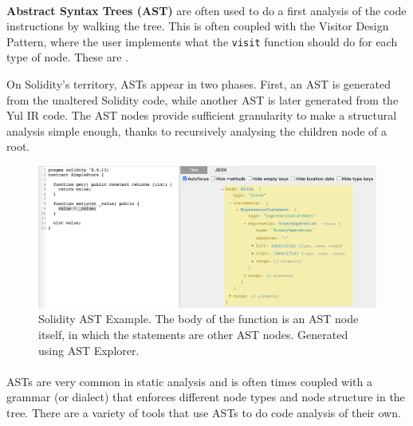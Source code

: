 \paragraph*{}
\textbf{Abstract Syntax Trees (AST)} are often used to do a first analysis of the code instructions by walking the tree. This is often coupled with the Visitor Design Pattern, where the user implements what the \lstinline[columns=fixed]{visit} function should do for each type of node. These are \cite[``widely used in compilers to represent the structure of program code'']{ast-wiki}.

On Solidity's territory, ASTs appear in two phases. First, an AST is generated from the unaltered Solidity code, while another AST is later generated from the Yul IR code. The AST nodes provide sufficient granularity to make a structural analysis simple enough, thanks to recursively analysing the children node of a root.

\begin{figure}
    \centering
    \includegraphics[width=15cm]{images/solidity_ast_example.png}
    \caption{Solidity AST Example. The body of the function is an AST node itself, in which the statements are other AST nodes. Generated using AST Explorer.}
    \label{fig:solidity-ast-example}
\end{figure}

\paragraph*{}
ASTs are very common in static analysis and is often times coupled with a grammar (or dialect) that enforces different node types and node structure in the tree. There are a variety of tools that use ASTs to do code analysis of their own.



